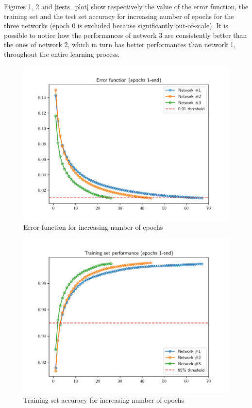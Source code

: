 \documentclass[letterpaper,headings=standardclasses]{scrartcl}
\begin{document}
Figures \ref{errors_plot}, \ref{trains_plot} and \ref{tests_plot} show respectively the value of the error function, the training set and the test set accuracy for increasing number of epochs for the three networks (epoch 0 is excluded because significantly out-of-scale). It is possible to notice how the performances of network 3 are consistently better than the ones of network 2, which in turn has better performances than network 1, throughout the entire learning process.

\begin{figure}[H]
    \centering
    \includegraphics[width=.7\linewidth]{errors.pdf}
    \caption{Error function for increasing number of epochs}
    \label{errors_plot}
\end{figure}

\begin{figure}[H]
    \centering
    \includegraphics[width=.7\linewidth]{trains.pdf}
    \caption{Training set accuracy for increasing number of epochs}
    \label{trains_plot}
\end{figure}
\end{document}
